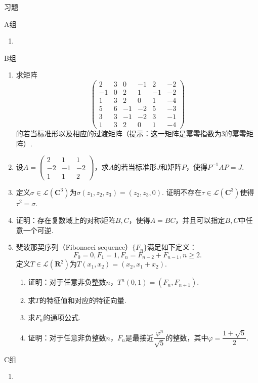 \vspace{2ex}
\centerline{\heiti \Large 习题}

\vspace{2ex}
{\kaishu }
\begin{flushright}
    \kaishu

\end{flushright}

\centerline{\heiti A组}
\begin{enumerate}
    \item
\end{enumerate}

\centerline{\heiti B组}
\begin{enumerate}
    \item 求矩阵\[\begin{pmatrix}
                  2 & 3 & 0  & -1 & 2 & -2 \\ -1 & 0 & 2 & 1 & -1 & -2 \\
                  1 & 3 & 2  & 0  & 1 & -4 \\ 5 & 6 & -1 & -2 & 5 & -3 \\
                  3 & 3 & -1 & -2 & 3 & -1 \\ 1 & 3 & 2 & 0 & 1 & -4
              \end{pmatrix}\]的若当标准形以及相应的过渡矩阵（提示：这一矩阵是幂零指数为3的幂零矩阵）.

    \item 设$A=\begin{pmatrix}
                  2 & 1 & 1 \\ -2 & -1 & -2 \\ 1 & 1 & 2
              \end{pmatrix}$，求$A$的若当标准形$J$和矩阵$P$，使得$P^{-1}AP=J$.

    \item 定义$\sigma\in \mathcal{L}(\mathbf{C}^3)$为$\sigma(z_1,z_2,z_3)=(z_2,z_3,0)$. 证明不存在$\tau\in \mathcal{L}(\mathbf{C}^3)$使得$\tau^2=\sigma$.

    \item 证明：存在复数域上的对称矩阵$B,C$，使得$A=BC$，并且可以指定$B,C$中任意一个可逆.

    \item 斐波那契序列（Fibonacci sequence）$\{F_n\}$满足如下定义：
          \[
              F_0 = 0, F_1 = 1, F_n = F_{n - 2} + F_{n - 1}, n \geqslant 2.
          \]
          定义$T \in \mathcal{L}(\mathbf{R}^2)$为$T(x_1, x_2) = (x_2, x_1 + x_2)$.
          \begin{enumerate}
            \item 证明：对于任意非负整数$n$，$T^n(0, 1) = (F_n, F_{n + 1})$.
            \item 求$T$的特征值和对应的特征向量.
            \item 求$F_n$的通项公式.
            \item 证明：对于任意非负整数$n$，$F_n$是最接近$\dfrac{\varphi^n}{\sqrt{5}}$的整数，其中$\varphi = \dfrac{1 + \sqrt{5}}{2}$.
          \end{enumerate}
\end{enumerate}

\centerline{\heiti C组}
\begin{enumerate}
    \item
\end{enumerate}
